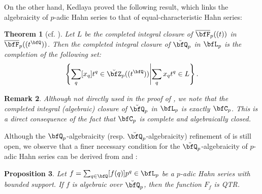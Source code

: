 \documentclass[english,oneside]{smfart}
\newtheorem{theorem}{Theorem}[section]
\newtheorem{remark}[theorem]{Remark}
\newtheorem{proposition}[theorem]{Proposition}
\begin{document}
On the other hand, Kedlaya proved the following result, which links the algebraicity of $p$-adic Hahn series to that of equal-characteristic Hahn series:
\begin{theorem}[{cf. \cite[Theorem 13.5]{kedlayaAlgebraicityGeneralizedPower2017b}}]\label{thm:47}
    Let $L$ be the completed integral closure of $\overline{\bfF}_p((t))$ in $\overline{\bfF}_p((t^\bfQ))$. Then the completed integral closure of $\breve{\bfQ}_p$ in $\bfL_p$ is the completion of the following set:
    $$\left\{\sum_q[x_q]t^q\in \breve{\bfZ}_p((t^\bfQ))\middle\vert\sum_q x_q t^q\in L\right\}.$$
\end{theorem}
\begin{remark}
    Although not directly used in the proof of , we note that the completed integral (algebraic) closure of $\breve{\bfQ}_p$ in $\bfL_p$ is exactly $\bfC_p$. This is a direct consequence of the fact that $\bfC_p$ is complete and algebraically closed.
\end{remark}
Although the $\bfQ_p$-algebraicity (resp. $\breve{\bfQ}_p$-algebraicity) refinement of  is still open, we observe that a finer necessary condition for the $\breve{\bfQ}_p$-algebraicity of $p$-adic Hahn series can be derived from  and :
\begin{proposition}\label{prop:167}
    Let $f=\sum_{q\in\bfQ}[f(q)]p^q\in\bfL_p$ be a $p$-adic Hahn series with bounded support. If $f$ is algebraic over $\breve{\bfQ}_p$, then the function $F_f$ is QTR.
\end{proposition}
\end{document}
